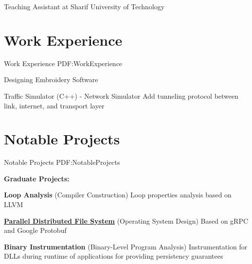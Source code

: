 \documentclass[a4paper,9pt,oneside]{article}
\begin{document}
\begin{body}
\BulletItem Teaching Assistant at Sharif University of Technology




\section
{Work\newline
Experience}
{Work Experience}
{PDF:WorkExperience}


\GapNoBreak
\SubBulletItem
Designing Embroidery Software



\GapNoBreak
\SubBulletItem
Traffic Simulator (C++) - Network Simulator
\SubBulletItem
Add tunneling protocol between link, internet, and transport layer




\section
{Notable Projects}
{Notable Projects}
{PDF:NotableProjects}

\textbf{Graduate Projects:}

\BulletItem
\textbf{Loop Analysis}
(Compiler Construction)
\hfill
{}
\SubBulletItem
Loop properties analysis based on LLVM

\BulletItem
\href{https://github.com/arminvakil/PFS}
{\textbf{Parallel Distributed File System}}
(Operating System Design)
\hfill
{}
\SubBulletItem
Based on gRPC and Google Protobuf

\BulletItem
\textbf{Binary Instrumentation}
(Binary-Level Program Analysis)
\hfill
{}
\SubBulletItem
Instrumentation for DLLs during runtime of applications for providing persistency guarantees


\end{body}
\end{document}
